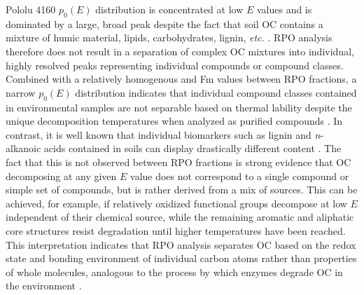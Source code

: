 Pololu 4160 $p_{0}(E)$ distribution is concentrated at low $E$ values and is dominated by a large, broad peak despite the fact that soil OC contains a mixture of humic material, lipids, carbohydrates, lignin, \textit{etc.} \citep[Figure \ref{Ch3Fig:8}C;][]{Helfrich:2007ej}. RPO analysis therefore does not result in a separation of complex OC mixtures into individual, highly resolved peaks representing individual compounds or compound classes. Combined with a relatively homogenous  and Fm values between RPO fractions, a narrow $p_{0}(E)$ distribution indicates that individual compound classes contained in environmental samples are not separable based on thermal lability despite the unique decomposition temperatures when analyzed as purified compounds \citep{Williams:2014bq}. In contrast, it is well known that individual biomarkers such as lignin and \textit{n}-alkanoic acids contained in soils can display drastically different  content \citep[see][for review]{Schmidt:2011gg}. The fact that this is not observed between RPO fractions is strong evidence that OC decomposing at any given $E$ value does not correspond to a single compound or simple set of compounds, but is rather derived from a mix of sources. This can be achieved, for example, if relatively oxidized functional groups decompose at low $E$ independent of their chemical source, while the remaining aromatic and aliphatic core structures resist degradation until higher temperatures have been reached. This interpretation indicates that RPO analysis separates OC based on the redox state and bonding environment of individual carbon atoms rather than properties of whole molecules, analogous to the process by which enzymes degrade OC in the environment \citep{Sinsabaugh:2008il}. 

